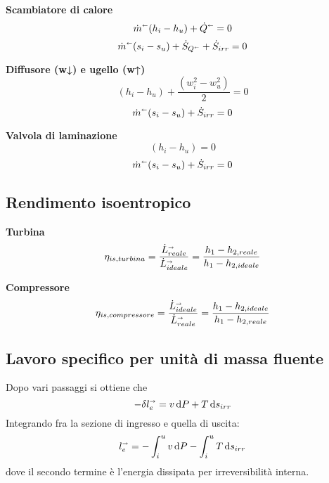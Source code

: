 \textbf{Scambiatore di calore}
\[ \dot{m}^\shortleftarrow (h_i - h_u) + \dot{Q}^\shortleftarrow = 0 \]
\[ \dot{m}^\shortleftarrow (s_i - s_u) + \dot{S}_{Q^\shortleftarrow} + \dot{S}_{irr} = 0 \]

\textbf{Diffusore (w↓) e ugello (w↑)}
\[  (h_i - h_u) + \frac{(w_i^2 - w_u^2)}{2} = 0 \]
\[ \dot{m}^\shortleftarrow (s_i - s_u) + \dot{S}_{irr} = 0 \]

\textbf{Valvola di laminazione}
\[  (h_i - h_u) = 0 \]
\[ \dot{m}^\shortleftarrow (s_i - s_u) + \dot{S}_{irr} = 0 \]

\subsection{Rendimento isoentropico}
\textbf{Turbina}
\[ \eta_{is,turbina} = \frac{\dot{L}_{reale}^\shortrightarrow}{\dot{L}_{ideale}^\shortrightarrow} = \frac{h_1 - h_{2,reale}}{h_1 - h_{2,ideale}} \]

\textbf{Compressore}
\[ \eta_{is,compressore} = \frac{\dot{L}_{ideale}^\shortrightarrow}{\dot{L}_{reale}^\shortrightarrow} = \frac{h_1 - h_{2,ideale}}{h_1 - h_{2,reale}} \]

\subsection{Lavoro specifico per unità di massa fluente}
Dopo vari passaggi si ottiene che
\[ -\delta l_e^\shortrightarrow = v\dd{P} + T\dd{s_{irr}} \]
Integrando fra la sezione di ingresso e quella di uscita:
\[ l_e^\shortrightarrow = -\int_i^u v\dd{P} -\int_i^u T\dd{s_{irr}} \]
dove il secondo termine è l'energia dissipata per irreversibilità interna.
